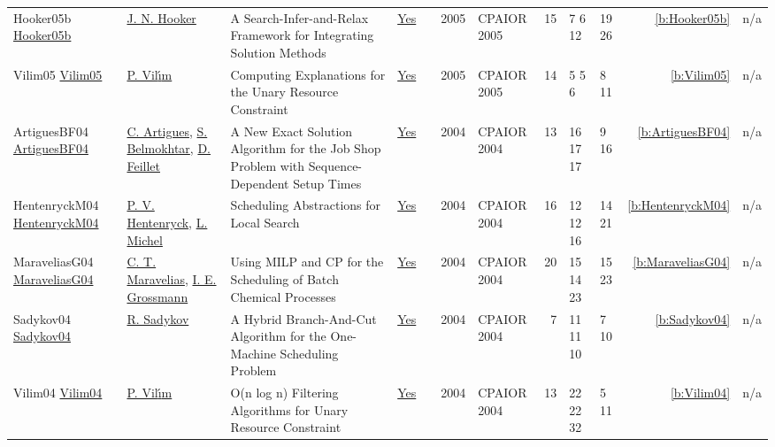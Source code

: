 {\begin{longtable}{>{\raggedright\arraybackslash}p{3cm}>{\raggedright\arraybackslash}p{4.5cm}>{\raggedright\arraybackslash}p{6.0cm}rrrp{2.5cm}rp{1cm}p{1cm}rr}
Hooker05b \href{https://doi.org/10.1007/11493853_19}{Hooker05b} & \hyperref[auth:a160]{J. N. Hooker} & \cellcolor{green!10}A Search-Infer-and-Relax Framework for Integrating Solution Methods & \href{../works/Hooker05b.pdf}{Yes} & \cite{Hooker05b} & 2005 & CPAIOR 2005 & 15 & 7 6 12 & 19 26 & \ref{b:Hooker05b} & n/a\\
Vilim05 \href{https://doi.org/10.1007/11493853_29}{Vilim05} & \hyperref[auth:a121]{P. Vil{\'{\i}}m} & Computing Explanations for the Unary Resource Constraint & \href{../works/Vilim05.pdf}{Yes} & \cite{Vilim05} & 2005 & CPAIOR 2005 & 14 & 5 5 6 & 8 11 & \ref{b:Vilim05} & n/a\\
ArtiguesBF04 \href{https://doi.org/10.1007/978-3-540-24664-0_3}{ArtiguesBF04} & \hyperref[auth:a6]{C. Artigues}, \hyperref[auth:a383]{S. Belmokhtar}, \hyperref[auth:a356]{D. Feillet} & A New Exact Solution Algorithm for the Job Shop Problem with Sequence-Dependent Setup Times & \href{../works/ArtiguesBF04.pdf}{Yes} & \cite{ArtiguesBF04} & 2004 & CPAIOR 2004 & 13 & 16 17 17 & 9 16 & \ref{b:ArtiguesBF04} & n/a\\
HentenryckM04 \href{https://doi.org/10.1007/978-3-540-24664-0_22}{HentenryckM04} & \hyperref[auth:a148]{P. V. Hentenryck}, \hyperref[auth:a32]{L. Michel} & \cellcolor{green!10}Scheduling Abstractions for Local Search & \href{../works/HentenryckM04.pdf}{Yes} & \cite{HentenryckM04} & 2004 & CPAIOR 2004 & 16 & 12 12 16 & 14 21 & \ref{b:HentenryckM04} & n/a\\
MaraveliasG04 \href{https://doi.org/10.1007/978-3-540-24664-0_1}{MaraveliasG04} & \hyperref[auth:a381]{C. T. Maravelias}, \hyperref[auth:a382]{I. E. Grossmann} & Using {MILP} and {CP} for the Scheduling of Batch Chemical Processes & \href{../works/MaraveliasG04.pdf}{Yes} & \cite{MaraveliasG04} & 2004 & CPAIOR 2004 & 20 & 15 14 23 & 15 23 & \ref{b:MaraveliasG04} & n/a\\
Sadykov04 \href{https://doi.org/10.1007/978-3-540-24664-0_31}{Sadykov04} & \hyperref[auth:a384]{R. Sadykov} & A Hybrid Branch-And-Cut Algorithm for the One-Machine Scheduling Problem & \href{../works/Sadykov04.pdf}{Yes} & \cite{Sadykov04} & 2004 & CPAIOR 2004 & 7 & 11 11 10 & 7 10 & \ref{b:Sadykov04} & n/a\\
Vilim04 \href{https://doi.org/10.1007/978-3-540-24664-0_23}{Vilim04} & \hyperref[auth:a121]{P. Vil{\'{\i}}m} & O(n log n) Filtering Algorithms for Unary Resource Constraint & \href{../works/Vilim04.pdf}{Yes} & \cite{Vilim04} & 2004 & CPAIOR 2004 & 13 & 22 22 32 & 5 11 & \ref{b:Vilim04} & n/a\\
\end{longtable}
}

